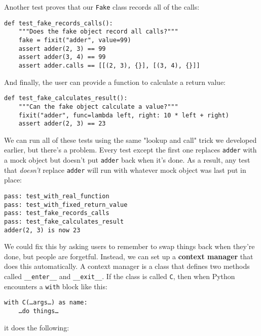 \documentclass{scrbook}
\newcommand{\glossref}[1]{\textbf{#1}}
\begin{document}
Another test proves that our \texttt{Fake} class records
all of the calls:


\begin{lstlisting}[frame=single,frameround=tttt]
def test_fake_records_calls():
    """Does the fake object record all calls?"""
    fake = fixit("adder", value=99)
    assert adder(2, 3) == 99
    assert adder(3, 4) == 99
    assert adder.calls == [[(2, 3), {}], [(3, 4), {}]]
\end{lstlisting}



And finally,
the user can provide a function to calculate a return value:


\begin{lstlisting}[frame=single,frameround=tttt]
def test_fake_calculates_result():
    """Can the fake object calculate a value?"""
    fixit("adder", func=lambda left, right: 10 * left + right)
    assert adder(2, 3) == 23
\end{lstlisting}



We can run all of these tests using the same "lookup and call" trick
we developed earlier,
but there's a problem.
Every test except the first one replaces \texttt{adder} with a mock object
but doesn't put \texttt{adder} back when it's done.
As a result,
any test that \emph{doesn't} replace \texttt{adder} will run with
whatever mock object was last put in place:


\begin{lstlisting}[frame=single,frameround=tttt]
pass: test_with_real_function
pass: test_with_fixed_return_value
pass: test_fake_records_calls
pass: test_fake_calculates_result
adder(2, 3) is now 23
\end{lstlisting}



We could fix this by asking users to remember to swap things back when they're done,
but people are forgetful.
Instead,
we can set up a \glossref{context manager} that does this automatically.
A context manager is a class that defines two methods called \texttt{\_\_enter\_\_} and \texttt{\_\_exit\_\_}.
If the class is called \texttt{C},
then when Python encounters a \texttt{with} block like this:

\begin{lstlisting}[frame=single,frameround=tttt]
with C(…args…) as name:
    …do things…
\end{lstlisting}


\noindent it does the following:
\end{document}
